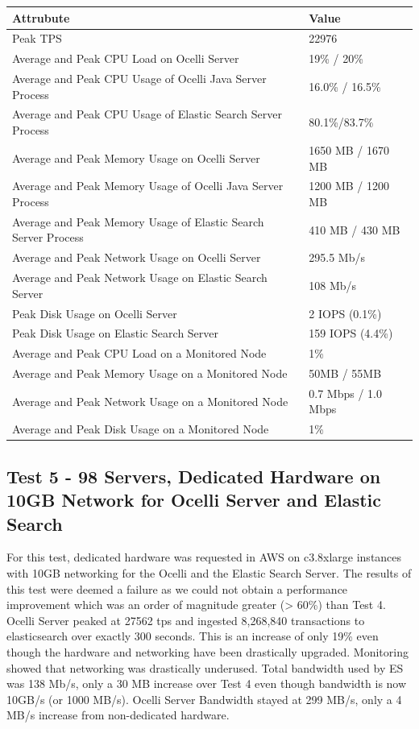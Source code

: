 \documentclass{llncs}
\begin{document}
\begin{flushleft}
    \begin{tabular}{ | l | l |}
    \hline
  Attrubute & Value  \\ \hline
  Peak TPS & 22976  \\ \hline
  Average and Peak CPU Load on Ocelli Server &19\% / 20\%  \\ \hline
  Average and Peak CPU Usage of Ocelli Java Server Process & 16.0\% / 16.5\% \\ \hline
 Average and Peak CPU Usage of Elastic Search Server Process & 80.1\%/83.7\%	  \\ \hline
  Average and Peak Memory Usage on Ocelli Server & 1650 MB / 1670 MB	 \\ \hline
  Average and Peak Memory Usage of Ocelli Java Server Process &	1200 MB / 1200 MB		 \\ \hline
 Average and Peak Memory Usage of Elastic Search Server Process &	410 MB / 430 MB		 \\ \hline
Average and Peak Network Usage on Ocelli Server &	295.5 Mb/s 	 \\ \hline
Average and Peak Network Usage on Elastic Search Server & 108 Mb/s 	 \\ \hline
Peak Disk Usage on Ocelli Server &	2 IOPS (0.1\%)		 \\ \hline
Peak Disk Usage on Elastic Search Server &	159 IOPS (4.4\%)		 \\ \hline
Average and Peak CPU Load on a Monitored Node& 	1\% 	 \\ \hline
  Average and Peak Memory Usage on a Monitored Node &	50MB / 55MB	 \\ \hline
Average and Peak Network Usage on a Monitored Node &	0.7 Mbps / 1.0 Mbps		 \\ \hline
  Average and Peak Disk Usage on a Monitored Node &  1\%	\\ 
    \hline
    \end{tabular}
\end{flushleft}

\subsection{Test 5 - 98 Servers, Dedicated Hardware on 10GB Network for Ocelli Server and Elastic Search }

For this test, dedicated hardware was requested in AWS on c3.8xlarge instances with 10GB networking for the Ocelli and the Elastic Search Server. The results of this test were deemed a failure as we could not obtain a performance improvement which was an order of magnitude greater (> 60\%) than Test 4. Ocelli Server peaked at 27562 tps and ingested 8,268,840 transactions to elasticsearch over exactly 300 seconds. This is an increase of only 19\% even though the hardware and networking have been drastically upgraded. Monitoring showed that networking was drastically underused. Total bandwidth used by ES was 138 Mb/s, only a 30 MB increase over Test 4 even though bandwidth is now 10GB/s (or 1000 MB/s). Ocelli Server Bandwidth stayed at 299 MB/s, only a 4 MB/s increase from non-dedicated hardware.
\end{document}
